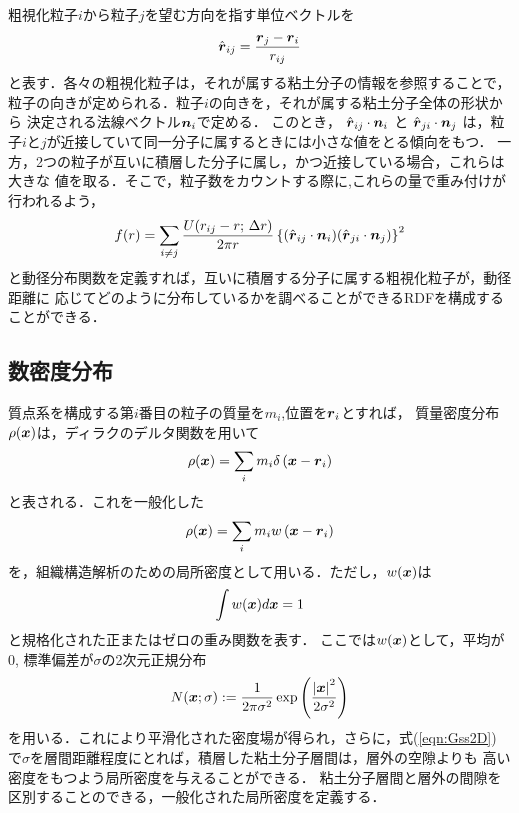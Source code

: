 粗視化粒子$i$から粒子$j$を望む方向を指す単位ベクトルを
\begin{equation}
	\hat{\mbox{\boldmath $r$}}_{ij}=\frac{\mbox{\boldmath $r$}_j-\mbox{\boldmath $r$}_i}{r_{ij}}
	\label{eqn:rhat}
\end{equation}
と表す．各々の粗視化粒子は，それが属する粘土分子の情報を参照することで，
粒子の向きが定められる．粒子$i$の向きを，それが属する粘土分子全体の形状から
決定される法線ベクトル$\mbox{\boldmath $n$}_i$で定める．
このとき，
$\hat{\mbox{\boldmath $r$}}_{ij}\cdot\mbox{\boldmath $n$}_i$
と
$\hat{\mbox{\boldmath $r$}}_{ji}\cdot\mbox{\boldmath $n$}_j$
は，粒子$i$と$j$が近接していて同一分子に属するときには小さな値をとる傾向をもつ．
一方，2つの粒子が互いに積層した分子に属し，かつ近接している場合，これらは大きな
値を取る．そこで，粒子数をカウントする際に,これらの量で重み付けが行われるよう，
\begin{equation}
	f(r)=
	\sum_{i\neq j} \frac{U(r_{ij}-r;\, \Delta r)}{2\pi r}
	\left\{
		(\hat{\mbox{\boldmath $r$}}_{ij} \cdot \mbox{\boldmath $n$}_i)
		(\hat{\mbox{\boldmath $r$}}_{ji} \cdot \mbox{\boldmath $n$}_j)
	\right\}^2
	\label{eqn:RDFn}
\end{equation}
と動径分布関数を定義すれば，互いに積層する分子に属する粗視化粒子が，動径距離に
応じてどのように分布しているかを調べることができるRDFを構成することができる．
\subsection{数密度分布}
質点系を構成する第$i$番目の粒子の質量を$m_i$,位置を$\mbox{\boldmath $r$}_i$とすれば，
質量密度分布$\rho(\mbox{\boldmath $x$})$は，ディラクのデルタ関数を用いて
\begin{equation}
	\rho(\mbox{\boldmath $x$})=\sum_{i} m_i\delta\left(\mbox{\boldmath $x$}-\mbox{\boldmath $r$}_i\right)
\end{equation}
と表される．これを一般化した
\begin{equation}
	\rho(\mbox{\boldmath $x$})=\sum_{i} m_i w\left(\mbox{\boldmath $x$}-\mbox{\boldmath $r$}_i\right)
	\label{eqn:rhox_gen}
\end{equation}
を，組織構造解析のための局所密度として用いる．ただし，$w(\mbox{\boldmath $x$})$は
\begin{equation}
	\int w(\mbox{\boldmath $x$}) d\mbox{\boldmath $x$} =1
\end{equation}
と規格化された正またはゼロの重み関数を表す．
ここでは$w(\mbox{\boldmath $x$})$として，平均が0, 標準偏差が$\sigma$の2次元正規分布
\begin{equation}
	N(\mbox{\boldmath $x$};\sigma):=
	\frac{1}{2\pi\sigma^2}
	\exp\left(
		\frac{\left|\mbox{\boldmath $x$}\right|^2}{2\sigma^2}
	\right)
	\label{eqn:Gss2D}
\end{equation}
を用いる．これにより平滑化された密度場が得られ，さらに，式(\ref{eqn:Gss2D})
で$\sigma$を層間距離程度にとれば，積層した粘土分子層間は，層外の空隙よりも
高い密度をもつよう局所密度を与えることができる．
粘土分子層間と層外の間隙を区別することのできる，一般化された局所密度を定義する．
